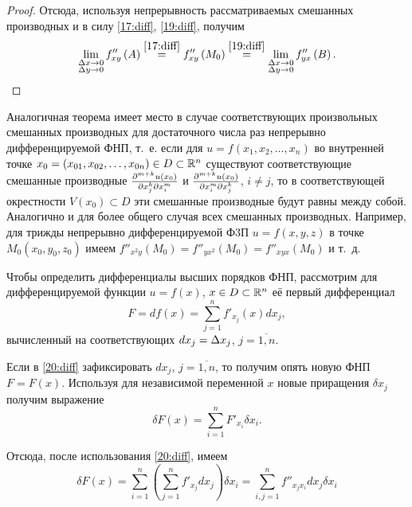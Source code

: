 \documentclass[../../main.tex]{subfiles}
\begin{document}
\begin{proof}
		Отсюда, используя непрерывность рассматриваемых смешанных 
		производных и в силу \eqref{17:diff}, \eqref{19:diff}, получим
		\[\lim_{
			\substack{\Delta x\rightarrow0\\
					\Delta y\rightarrow 0}
				}f''_{xy}\left(A\right)\overset{\eqref{17:diff}}{=}
		f''_{xy}\left(M_0\right)\overset{\eqref{19:diff}}{=}
		\lim_{
			\substack{\Delta x\rightarrow0\\
					\Delta y\rightarrow0}
				}f''_{yx}\left(B\right).\]
	\end{proof}

	\begin{rem}
		Аналогичная теорема имеет место в случае соответствующих 
		произвольных смешанных производных для достаточного числа 
		раз непрерывно дифференцируемой ФНП, т.~е. если для 
		$u = f\left(x_1, x_2,\dots, x_n\right)$ во внутренней 
		точке $x_0 = \left(x_{01}, x_{02},\dots, x_{0n}\right)
		\in D\subset \mathbb{R}^n$ существуют соответствующие смешанные 
		производные $\frac{\partial ^{m+k}u\left(x_0\right)}{\partial x_j^k\partial x_i^m}$ и 
		$\frac{\partial ^{m+k}u\left(x_0\right)}{\partial x_i^m\partial x_j^k}$, $i\ne j$, 
		то в соответствующей окрестности $V\left(x_0\right)\subset D$ эти 
		смешанные производные будут равны между собой. Аналогично и для более 
		общего случая всех смешанных производных. Например, для трижды 
		непрерывно дифференцируемой Ф3П $u=f\left(x, y, z\right)$ в точке 
		$M_0\left(x_0, y_0, z_0\right)$ имеем
		$f''_{x^2y}\left(M_0\right) = f''_{yx^2}\left(M_0\right) = 
		f''_{xyx}\left(M_0\right)$ и т.~д.
	\end{rem}

	Чтобы определить дифференциалы высших порядков ФНП, рассмотрим для 
	дифференцируемой функции $u=f\left(x\right)$, $x\in D\subset \mathbb{R}^n$ 
	её первый дифференциал
	\begin{equation}
		F = df\left(x\right) = \sum_{j = 1}^nf'_{x_j}\left(x\right)dx_j,
		\label{20:diff}
	\end{equation}
	вычисленный на соответствующих $dx_j = \Delta x_j$, $j = \overline{1, n}$.
	
	Если в \eqref{20:diff} зафиксировать $dx_j$, $j = \overline{1, n}$, то 
	получим опять новую ФНП $F = F(x)$. Используя для независимой переменной 
	$x$ новые приращения $\delta x_j$ получим выражение
	\[\delta F(x) = \sum_{i = 1}^nF'_{x_i}\delta x_i.\]
	
	Отсюда, после использования \eqref{20:diff}, имеем
	\begin{equation}
		\delta F(x) = \sum_{i = 1}^n\left(\sum_{j = 1}^nf'_{x_j}dx_j\right)
		\delta x_i = \sum_{i, j = 1}^nf''_{x_jx_i}dx_j\delta x_i
		\label{21:diff}
	\end{equation}
	
\end{document}
